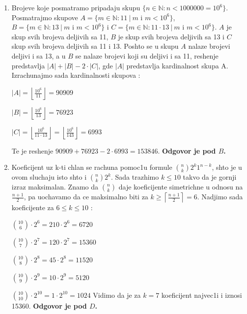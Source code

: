 \documentclass[a4paper,12pt]{article}
\begin{document}
\begin{enumerate}[1.]
\item Brojeve koje posmatramo pripadaju skupu $ \{n\in \mathbb{N} : n < 1 000 000 = 10^{6}\} $. Posmatrajmo skupove $A = \{ m \in \mathbb{N} : 11\ |\ m\mbox{\ i\ } m < 10^{6}\}$, $B = \{ m \in \mathbb{N} : 13\ |\ m\mbox{\ i\ } m < 10^{6}\}$ i $C = \{ m \in \mathbb{N} : 11 \cdot 13\ |\ m\mbox{\ i \ } m < 10^{6}\}$. $A$ je skup svih brojeva deljivih sa 11, $B$ je skup svih brojeva deljivih sa 13 i $C$ skup svih brojeva deljivih sa 11 i 13. Poshto se u skupu $A$ nalaze brojevi deljivi i sa 13, a u $B$ se nalaze brojevi koji su deljivi i sa 11, reshenje predstavlja $\lvert A \rvert + \lvert B \rvert  - 2 \cdot \lvert C \rvert $, gde $ \lvert A \rvert $ predstavlja kardinalnost skupa A. Izrachunajmo sada kardinalnosti skupova :
\par $ \lvert A \rvert = \left\lfloor \frac{10^{6}}{11}\right\rfloor   = 90909$  
\par  $ \lvert B \rvert = \left\lfloor \frac{10^{6}}{13}\right\rfloor   = 76923$
\par  $ \lvert C \rvert = \left\lfloor \frac{10^{6}}{11 \cdot 13}\right\rfloor = \left\lfloor \frac{10^{6}}{143}\right\rfloor  = 6993$  
\par Te je reshenje $ 90909 + 76923 - 2 \cdot 6993  = 153846$. \textbf{Odgovor je pod $B$.}

\item Koeficijent uz k-ti chlan se rachuna pomoc1u formule $\binom{n}{k}2^k1^{n-k}$, shto je u ovom sluchaju isto shto i $\binom{n}{k}2^{k} $. Sada trazhimo $ k \leq 10$ takvo da je gornji izraz maksimalan. Znamo da $\binom{n}{k}$ daje koeficijente simetrichne u odnosu na $\frac{n + 1}{2} $, pa uochavamo da ce maksimalno biti za $ k \geq \left\lceil \frac{n + 1}{2}\right\rceil   = 6$. Nadjimo sada koeficijente za $ 6 \leq k \leq 10$ : 
\par $\binom{10}{6}\cdot 2^{6} = 210 \cdot 2^{6} = 6720 $
\par $\binom{10}{7}\cdot 2^{7} = 120 \cdot 2^{7} = 15360 $
\par $\binom{10}{8}\cdot 2^{8} = 45 \cdot 2^{8} =  11520$
\par $\binom{10}{9}\cdot 2^{9} = 10 \cdot 2^{9} = 5120 $
\par $\binom{10}{10}\cdot 2^{10} = 1 \cdot 2^{10} = 1024 $
Vidimo da je za $k = 7$ koeficijent najvec1i i iznosi 15360. \textbf{Odgovor je pod $D$.}


\end{enumerate}
\end{document}
